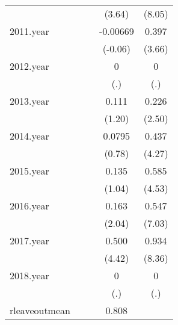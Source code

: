 {\begin{tabular}{l*{4}{c}}
            &                     &                     &      (3.64)         &      (8.05)         \\
[1em]
2011.year   &                     &                     &    -0.00669         &       0.397\sym{***}\\
            &                     &                     &     (-0.06)         &      (3.66)         \\
[1em]
2012.year   &                     &                     &           0         &           0         \\
            &                     &                     &         (.)         &         (.)         \\
[1em]
2013.year   &                     &                     &       0.111         &       0.226\sym{*}  \\
            &                     &                     &      (1.20)         &      (2.50)         \\
[1em]
2014.year   &                     &                     &      0.0795         &       0.437\sym{***}\\
            &                     &                     &      (0.78)         &      (4.27)         \\
[1em]
2015.year   &                     &                     &       0.135         &       0.585\sym{***}\\
            &                     &                     &      (1.04)         &      (4.53)         \\
[1em]
2016.year   &                     &                     &       0.163\sym{*}  &       0.547\sym{***}\\
            &                     &                     &      (2.04)         &      (7.03)         \\
[1em]
2017.year   &                     &                     &       0.500\sym{***}&       0.934\sym{***}\\
            &                     &                     &      (4.42)         &      (8.36)         \\
[1em]
2018.year   &                     &                     &           0         &           0         \\
            &                     &                     &         (.)         &         (.)         \\
[1em]
rleaveoutmean&                     &                     &       0.808\sym{***}&                     \\

\end{tabular}}
